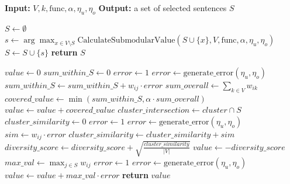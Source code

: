 \begin{algorithm}
\caption{Greedy Submodular Maximization for Text Summarization} 
\label{algo:greedy_text_sum}
\begin{algorithmic}[1]
\State \textbf{Input:} $V, k, \text{func}, \alpha, \eta_u, \eta_o$
\State \textbf{Output:} a set of selected sentences $S$

    \State $S \gets \emptyset$
        \State $s \gets \arg\max_{x \in V \setminus S} \text{CalculateSubmodularValue}(S \cup \{x\}, V, \text{func}, \alpha, \eta_u, \eta_o)$
        \State $S \gets S \cup \{s\}$
    \EndWhile
    \State \textbf{return} $S$
\EndProcedure

    \State $value \gets 0$
            \State $sum\_within\_S \gets 0$
            \State $error \gets 1$
                \State $error \gets \text{generate\_error}(\eta_u, \eta_o)$
            \EndIf
            \State $sum\_within\_S \gets sum\_within\_S + w_{ij} \cdot error$
        \EndFor
        \State $sum\_overall \gets \sum_{k \in V} w_{ik}$
        \State $covered\_value \gets \min(sum\_within\_S, \alpha \cdot sum\_overall)$
        \State $value \gets value + covered\_value$
    \EndFor
            \State $cluster\_intersection \gets cluster \cap S$
                \State $cluster\_similarity \gets 0$
                    \State $error \gets 1$
                        \State $error \gets \text{generate\_error}(\eta_u, \eta_o)$
                    \EndIf
                    \State $sim \gets w_{ij} \cdot error$
                    \State $cluster\_similarity \gets cluster\_similarity + sim$
                \EndFor
                \State $diversity\_score \gets diversity\_score + \sqrt{\frac{cluster\_similarity}{|V|}}$
            \EndIf
        \EndFor
        \State $value \gets -diversity\_score$
            \State $max\_val \gets \max_{j \in S} w_{ij}$
            \State $error \gets 1$
                \State $error \gets \text{generate\_error}(\eta_u, \eta_o)$
            \EndIf
            \State $value \gets value + max\_val \cdot error$
        \EndFor
    \EndIf
    \State \textbf{return} $value$
\EndFunction

\end{algorithmic}
\end{algorithm}


